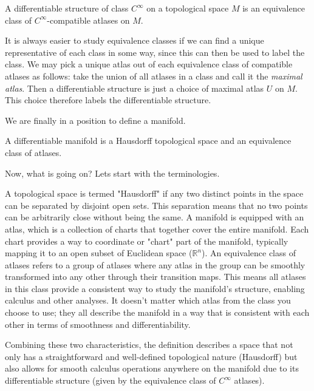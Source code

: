 \documentclass{article}
\begin{document}
\begin{theorem}
    A differentiable structure of class \(C^\infty\) on a topological space \(M\) is an equivalence class of \(C^\infty\)-compatible atlases on \(M\).     
\end{theorem}

It is always easier to study equivalence classes if we can find a unique representative of each class in some way, since this can then be used to label the class. We may pick a unique atlas out of each equivalence class of compatible atlases as follows: take the union of all atlases in a class and call it the \textit{maximal atlas}. Then a differentiable structure is just a choice of maximal atlas \(U\) on \(M\). This choice therefore labels the differentiable structure.

We are finally in a position to define a manifold.

\begin{theorem}
    A differentiable manifold is a Hausdorff topological space and an equivalence class of atlases.    
\end{theorem}

Now, what is going on? Lets start with the terminologies. 

A topological space is termed "Hausdorff" if any two distinct points in the space can be separated by disjoint open sets. This separation means that no two points can be arbitrarily close without being the same. A manifold is equipped with an atlas, which is a collection of charts that together cover the entire manifold. Each chart provides a way to coordinate or "chart" part of the manifold, typically mapping it to an open subset of Euclidean space (\(\mathbb{R}^n\)). An equivalence class of atlases refers to a group of atlases where any atlas in the group can be smoothly transformed into any other through their transition maps. This means all atlases in this class provide a consistent way to study the manifold’s structure, enabling calculus and other analyses.
It doesn't matter which atlas from the class you choose to use; they all describe the manifold in a way that is consistent with each other in terms of smoothness and differentiability.

Combining these two characteristics, the definition describes a space that not only has a straightforward and well-defined topological nature (Hausdorff) but also allows for smooth calculus operations anywhere on the manifold due to its differentiable structure (given by the equivalence class of \(C^\infty\) atlases).
\end{document}
